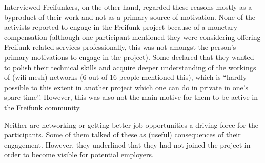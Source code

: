 Interviewed Freifunkers, on the other hand, regarded these reasons mostly as a byproduct of their work and not as a primary source of motivation.
None of the activists reported to engage in the Freifunk project because of a monetary compensation
(although one participant mentioned they were considering offering Freifunk related services professionally, this was not amongst the person's primary motivations to engage in the project).
Some declared that they wanted to polish their technical skills and acquire deeper understanding of the workings of (wifi mesh) networks (6 out of 16 people mentioned this), which is ``hardly possible to this extent in another project which one can do in private in one's spare time''.
However, this was also not the main motive for them to be active in the Freifunk community.

Neither are networking or getting better job opportunities a driving force for the participants.
Some of them talked of these as (useful) consequences of their engagement.
However, they underlined that they had not joined the project in order to become visible for potential employers.




